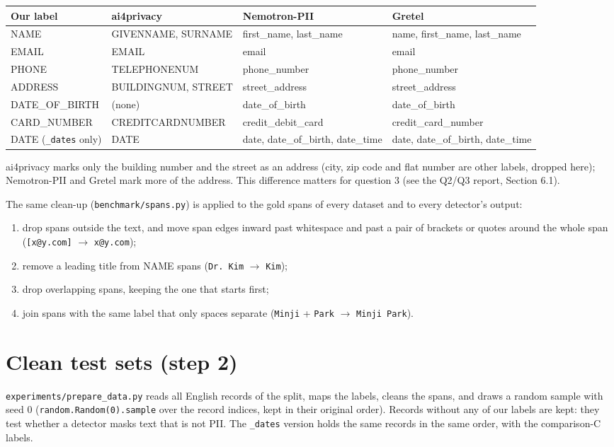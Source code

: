 \documentclass[10pt,a4paper]{article}
\newcommand{\file}[1]{\texttt{#1}}
\begin{document}
\begin{tabularx}{\linewidth}{@{}lLLL@{}}
\toprule
Our label & ai4privacy & Nemotron-PII & Gretel \\
\midrule
NAME & GIVENNAME, SURNAME & first\_name, last\_name & name, first\_name, last\_name \\
EMAIL & EMAIL & email & email \\
PHONE & TELEPHONENUM & phone\_number & phone\_number \\
ADDRESS & BUILDINGNUM, STREET & street\_address & street\_address \\
DATE\_OF\_BIRTH & (none) & date\_of\_birth & date\_of\_birth \\
CARD\_NUMBER & CREDITCARDNUMBER & credit\_debit\_card & credit\_card\_number \\
\midrule
DATE (\file{\_dates} only) & DATE & date, date\_of\_birth, date\_time & date, date\_of\_birth, date\_time \\
\bottomrule
\end{tabularx}

ai4privacy marks only the building number and the street as an address (city, zip code and
flat number are other labels, dropped here); Nemotron-PII and Gretel mark more of the address.
This difference matters for question 3 (see the Q2/Q3 report, Section 6.1).

The same clean-up (\file{benchmark/spans.py}) is applied to the gold spans of every dataset and to
every detector's output:
\begin{enumerate}
\item drop spans outside the text, and move span edges inward past whitespace and past a pair of
  brackets or quotes around the whole span (\file{[x@y.com]} $\to$ \file{x@y.com});
\item remove a leading title from NAME spans (\file{Dr. Kim} $\to$ \file{Kim});
\item drop overlapping spans, keeping the one that starts first;
\item join spans with the same label that only spaces separate (\file{Minji} + \file{Park} $\to$ \file{Minji Park}).
\end{enumerate}

\section{Clean test sets (step 2)}

\file{experiments/prepare\_data.py} reads all English records of the split, maps the labels,
cleans the spans, and draws a random sample with seed 0 (\file{random.Random(0).sample} over the
record indices, kept in their original order). Records without any of our labels are kept: they
test whether a detector masks text that is not PII. The \file{\_dates} version holds the same
records in the same order, with the comparison-C labels.
\end{document}
